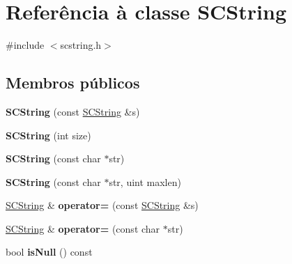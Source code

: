 \hypertarget{class_s_c_string}{\section{Referência à classe S\-C\-String}
\label{class_s_c_string}
}


{\ttfamily \#include $<$scstring.\-h$>$}

\subsection*{Membros públicos}
\begin{DoxyCompactItemize}
\item 
\hypertarget{class_s_c_string_a1666cb8a4fc4e04a738a366275e0e91d}{{\bfseries S\-C\-String} (const \hyperlink{class_s_c_string}{S\-C\-String} \&s)}\label{class_s_c_string_a1666cb8a4fc4e04a738a366275e0e91d}

\item 
\hypertarget{class_s_c_string_a4412dd6d6d20d7d9ef0ffabac5a3aadd}{{\bfseries S\-C\-String} (int size)}\label{class_s_c_string_a4412dd6d6d20d7d9ef0ffabac5a3aadd}

\item 
\hypertarget{class_s_c_string_a2b837aa7f9a4043262672f266007b87a}{{\bfseries S\-C\-String} (const char $\ast$str)}\label{class_s_c_string_a2b837aa7f9a4043262672f266007b87a}

\item 
\hypertarget{class_s_c_string_ab7016c1438b9d35f5160a26304f64b6d}{{\bfseries S\-C\-String} (const char $\ast$str, uint maxlen)}\label{class_s_c_string_ab7016c1438b9d35f5160a26304f64b6d}

\item 
\hypertarget{class_s_c_string_ad3cef8ce65a5e21539619a6d30663057}{\hyperlink{class_s_c_string}{S\-C\-String} \& {\bfseries operator=} (const \hyperlink{class_s_c_string}{S\-C\-String} \&s)}\label{class_s_c_string_ad3cef8ce65a5e21539619a6d30663057}

\item 
\hypertarget{class_s_c_string_aa4da8a9ae3a8e7bf0acac717cb156901}{\hyperlink{class_s_c_string}{S\-C\-String} \& {\bfseries operator=} (const char $\ast$str)}\label{class_s_c_string_aa4da8a9ae3a8e7bf0acac717cb156901}

\item 
\hypertarget{class_s_c_string_ac02f2a4d7312eb91f40980adfd4e31b2}{bool {\bfseries is\-Null} () const }\label{class_s_c_string_ac02f2a4d7312eb91f40980adfd4e31b2}


\end{DoxyCompactItemize}
